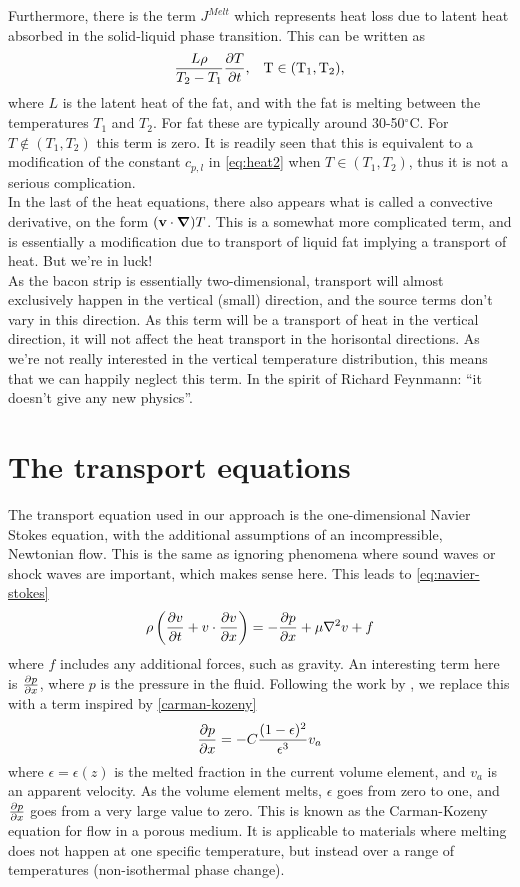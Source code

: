 Furthermore, there is the term $J^{Melt}$ which represents heat loss due to
latent heat absorbed in the solid-liquid phase transition. This can be written as 
\[ \frac{L \rho}{T_2-T_1} \frac{\partial T}{\partial t} \rm{,} \quad T \in (T_1,T_2) \rm{,}\]
where $L$ is the latent heat of the fat, and with the fat is melting between the temperatures 
$T_1$ and $T_2$. For fat these are typically around 30-50$^\circ$C. For $T
\notin (T_1,T_2)$ 
this term is zero. It is readily seen that this is equivalent to a modification of the constant
$c_{p,l}$ in \cref{eq:heat2} when $T \in (T_1,T_2)$, thus it is not a serious
complication.\\

In the last of the heat equations, there also appears what is called a
convective derivative, on the form $(\mathbf{v}\cdot \mbox{\boldmath$ \nabla $})T$. This is a somewhat
more complicated term, and is essentially a modification due to transport of
liquid fat implying a transport of heat. But we're in luck! \\

As the bacon strip is essentially two-dimensional, transport will almost
exclusively happen in the vertical (small) direction, and the
source terms don't vary in this direction. As this term will be a transport
of heat in the vertical direction, it will not affect the heat transport in
the horisontal directions.  As we're not really
interested in the vertical temperature distribution, this means that we can
happily neglect this term. In the spirit of Richard Feynmann: ``it doesn't give
any new physics''.

\section{The transport equations}
The transport equation used in our approach is the one-dimensional Navier Stokes
equation, with the additional assumptions of an incompressible, Newtonian flow.
This is the same as ignoring phenomena where sound waves or shock waves are
important, which makes sense here. This leads to \cref{eq:navier-stokes}
\begin{equation}
  \rho \left(\frac{\partial v}{\partial t} + v \cdot \frac{\partial v}{\partial x}\right) = -\frac{\partial p}{\partial x} + \mu \nabla^2 v + f
 \label{eq:navier-stokes}
\end{equation}
where $f$ includes any additional forces, such as gravity. An interesting term here is $\frac{\partial p}{\partial x}$, where
$p$ is the pressure in the fluid. Following the work by \cite{brent}, we replace
this with a term inspired by \cref{carman-kozeny}
\begin{equation}
  \frac{\partial p}{\partial x} = -C\frac{ (1-\epsilon)^2}{\epsilon^3} v_a
  \label{carman-kozeny}
\end{equation}
where $\epsilon = \epsilon(z)$ is the melted fraction in the current volume element, and
$v_a$ is an apparent velocity. As the volume element melts, $\epsilon$ goes from
zero to one, and $\frac{\partial p}{\partial x}$ goes from a very large value to zero. This is known 
as the Carman-Kozeny equation for flow in a porous medium. It is applicable to 
materials where melting does not happen at one specific temperature, but instead 
over a range of temperatures (non-isothermal phase change). \cite{poirier} \\

